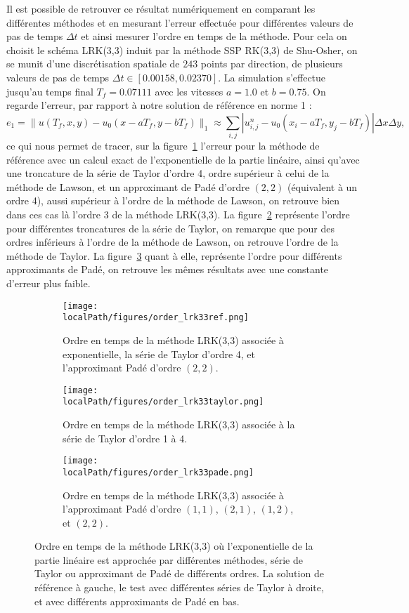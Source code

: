 Il est possible de retrouver ce résultat numériquement en comparant les différentes méthodes et en mesurant l'erreur effectuée pour différentes valeurs de pas de temps $\Delta t$ et ainsi mesurer l'ordre en temps de la méthode. Pour cela on choisit le schéma LRK(3,3) induit par la méthode SSP RK(3,3) de Shu-Osher, on se munit d'une discrétisation spatiale de $243$ points par direction, de plusieurs valeurs de pas de temps $\Delta t\in[0.00158,0.02370]$. La simulation s'effectue jusqu'au temps final $T_f=0.07111$ avec les vitesses $a=1.0$ et $b=0.75$. On regarde l'erreur, par rapport à notre solution de référence en norme 1 :
$$
  e_1 = \| u(T_f,x,y) - u_0(x-aT_f,y-bT_f) \|_1 \approx \sum_{i,j}|u^n_{i,j}-u_0(x_i-aT_f,y_j-bT_f)|\Delta x\Delta y,
$$
ce qui nous permet de tracer, sur la figure~\ref{fig:lrk33ref} l'erreur pour la méthode de référence avec un calcul exact de l'exponentielle de la partie linéaire, ainsi qu'avec une troncature de la série de Taylor d'ordre 4, ordre supérieur à celui de la méthode de Lawson, et un approximant de Padé d'ordre $(2,2)$ (équivalent à un ordre 4), aussi supérieur à l'ordre de la méthode de Lawson, on retrouve bien dans ces cas là l'ordre 3 de la méthode LRK(3,3). La figure~\ref{fig:lrk33taylor} représente l'ordre pour différentes troncatures de la série de Taylor, on remarque que pour des ordres inférieurs à l'ordre de la méthode de Lawson, on retrouve l'ordre de la méthode de Taylor. La figure~\ref{fig:lrk33pade} quant à elle, représente l'ordre pour différents approximants de Padé, on retrouve les mêmes résultats avec une constante d'erreur plus faible.

\begin{figure}
  \centering
  \begin{subfigure}{.45\textwidth}
    \centering
    \texttt{[image: \\localPath/figures/order\_lrk33ref.png]}
    \caption{Ordre en temps de la méthode LRK(3,3) associée à exponentielle, la série de Taylor d'ordre 4, et l'approximant Padé d'ordre $(2,2)$.}
    \label{fig:lrk33ref}
  \end{subfigure}
  \begin{subfigure}{.45\textwidth}
    \centering
    \texttt{[image: \\localPath/figures/order\_lrk33taylor.png]}
    \caption{Ordre en temps de la méthode LRK(3,3) associée à la série de Taylor d'ordre 1 à 4.\\ }
    \label{fig:lrk33taylor}
  \end{subfigure}
  \begin{subfigure}{.45\textwidth}
    \centering
    \texttt{[image: \\localPath/figures/order\_lrk33pade.png]}
    \caption{Ordre en temps de la méthode LRK(3,3) associée à l'approximant Padé d'ordre $(1,1)$, $(2,1)$, $(1,2)$, et $(2,2)$.}
    \label{fig:lrk33pade}
  \end{subfigure}
  \caption{Ordre en temps de la méthode LRK(3,3) où l'exponentielle de la partie linéaire est approchée par différentes méthodes, série de Taylor ou approximant de Padé de différents ordres. La solution de référence à gauche, le test avec différentes séries de Taylor à droite, et avec différents approximants de Padé en bas.}
  \label{fig:3:order}
\end{figure}

